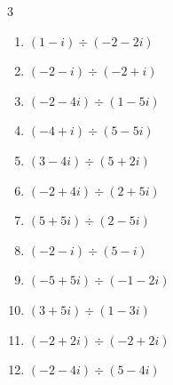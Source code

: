 \begin{multicols}{3}
\begin{enumerate}

  \item $\displaystyle (1-i)\div(-2-2i)$


  \item $\displaystyle (-2-i)\div(-2+i)$


  \item $\displaystyle (-2-4i)\div(1-5i)$


  \item $\displaystyle (-4+i)\div(5-5i)$


  \item $\displaystyle (3-4i)\div(5+2i)$


  \item $\displaystyle (-2+4i)\div(2+5i)$


  \item $\displaystyle (5+5i)\div(2-5i)$


  \item $\displaystyle (-2-i)\div(5-i)$


\columnbreak %

  \item $\displaystyle (-5+5i)\div(-1-2i)$

        \phantom{$\displaystyle =-1-3i$}

  \item $\displaystyle (3+5i)\div(1-3i)$


  \item $\displaystyle (-2+2i)\div(-2+2i)$

        \phantom{$\displaystyle =1$}

  \item $\displaystyle (-2-4i)\div(5-4i)$


\end{enumerate}
\end{multicols}
